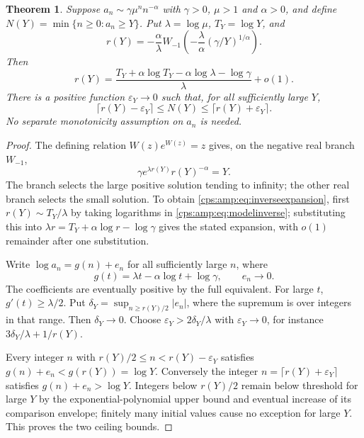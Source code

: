 \documentclass[11pt,letterpaper]{article}
\numberwithin{equation}{section}
\newtheorem{theorem}{Theorem}[section]
\theoremstyle{remark}\newtheorem{remark}[theorem]{Remark}
\begin{document}
\begin{theorem}\label{cps:amp:thm:inverse}
Suppose $a_n\sim\gamma\mu^nn^{-\alpha}$ with $\gamma>0$, $\mu>1$ and $\alpha>0$, and define $N(Y)=\min\{n\ge0:a_n\ge Y\}$. Put $\lambda=\log\mu$, $T_Y=\log Y$, and
\begin{equation}\label{cps:amp:eq:W}
 r(Y)=-\frac\alpha\lambda W_{-1}\!\left(-\frac\lambda\alpha(\gamma/Y)^{1/\alpha}\right).
\end{equation}
Then
\begin{equation}\label{cps:amp:eq:inverseexpansion}
 r(Y)=\frac{T_Y+\alpha\log T_Y-\alpha\log\lambda-\log\gamma}{\lambda}+o(1).
\end{equation}
There is a positive function $\varepsilon_Y\to0$ such that, for all sufficiently large $Y$,
\begin{equation}\label{cps:amp:eq:ceiling}
 \lceil r(Y)-\varepsilon_Y\rceil\le N(Y)\le\lceil r(Y)+\varepsilon_Y\rceil.
\end{equation}
No separate monotonicity assumption on $a_n$ is needed.
\end{theorem}
\begin{proof}
The defining relation $W(z)e^{W(z)}=z$ gives, on the negative real branch $W_{-1}$,
\begin{equation}\label{cps:amp:eq:modelinverse}
 \gamma e^{\lambda r(Y)}r(Y)^{-\alpha}=Y.
\end{equation}
The branch selects the large positive solution tending to infinity; the other real branch selects the small solution. To obtain \eqref{cps:amp:eq:inverseexpansion}, first $r(Y)\sim T_Y/\lambda$ by taking logarithms in \eqref{cps:amp:eq:modelinverse}; substituting this into
$\lambda r=T_Y+\alpha\log r-\log\gamma$ gives the stated expansion, with $o(1)$ remainder after one substitution.

Write $\log a_n=g(n)+e_n$ for all sufficiently large $n$, where
\begin{equation}
 g(t)=\lambda t-\alpha\log t+\log\gamma,\qquad e_n\to0.
\end{equation}
The coefficients are eventually positive by the full equivalent. For large $t$, $g'(t)\ge\lambda/2$. Put
$\delta_Y=\sup_{n\ge r(Y)/2}|e_n|$, where the supremum is over integers in that range. Then $\delta_Y\to0$. Choose $\varepsilon_Y>2\delta_Y/\lambda$ with $\varepsilon_Y\to0$, for instance $3\delta_Y/\lambda+1/r(Y)$.

Every integer $n$ with $r(Y)/2\le n<r(Y)-\varepsilon_Y$ satisfies
$g(n)+e_n<g(r(Y))=\log Y$. Conversely the integer
$n=\lceil r(Y)+\varepsilon_Y\rceil$ satisfies $g(n)+e_n>\log Y$. Integers below $r(Y)/2$ remain below threshold for large $Y$ by the exponential-polynomial upper bound and eventual increase of its comparison envelope; finitely many initial values cause no exception for large $Y$. This proves the two ceiling bounds.
\end{proof}
\end{document}
